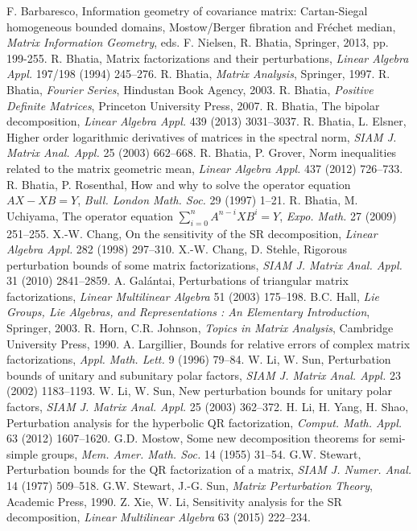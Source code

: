 \documentclass[12pt,epsfig,reqno]{amsart}
\theoremstyle{remark}
\begin{document}
\begin{thebibliography}{99}
 F. Barbaresco, Information geometry of covariance matrix: Cartan-Siegal homogeneous bounded domains, Mostow/Berger fibration and Fr\'echet median, {\it Matrix Information Geometry}, eds. F. Nielsen, R. Bhatia, Springer, 2013, pp. 199-255.
 R. Bhatia, Matrix factorizations and their perturbations, {\it Linear Algebra Appl.} 197/198 (1994) 245–276.
 R. Bhatia, {\it Matrix Analysis}, Springer, 1997.
 R. Bhatia, {\it Fourier Series}, Hindustan Book Agency, 2003.
 R. Bhatia, {\it Positive Definite Matrices}, Princeton University Press, 2007.
 R. Bhatia, The bipolar decomposition, {\it Linear Algebra Appl.} 439 (2013) 3031--3037.
 R. Bhatia, L. Elsner, Higher order logarithmic derivatives of matrices in the spectral norm, {\it SIAM J. Matrix Anal. Appl.} 25 (2003) 662--668.
 R. Bhatia, P. Grover, Norm inequalities related to the matrix geometric mean, {\it Linear Algebra Appl.} 437 (2012) 726--733.
 R. Bhatia, P. Rosenthal, How and why to solve the operator equation $AX-XB=Y$, {\it Bull. London Math. Soc.} 29 (1997) 1--21.
 R. Bhatia, M. Uchiyama, The operator equation $\sum_{i=0}^n A^{n-i} X B^i=Y$, {\it Expo. Math.} 27 (2009) 251--255.
 X.-W. Chang, On the sensitivity of the SR decomposition, {\it Linear Algebra Appl.} 282 (1998) 297--310.
 X.-W. Chang, D. Stehle, Rigorous perturbation bounds of some matrix factorizations, {\it SIAM J. Matrix Anal. Appl.} 31 (2010) 2841--2859.
 A. Gal\'antai, Perturbations of triangular matrix factorizations, {\it Linear Multilinear Algebra} 51 (2003) 175--198.
 B.C. Hall, {\it Lie Groups, Lie Algebras, and Representations : An Elementary Introduction},  Springer, 2003.
 R. Horn, C.R. Johnson, {\it Topics in Matrix Analysis}, Cambridge University Press, 1990.
 A. Largillier, Bounds for relative errors of complex matrix factorizations, {\it Appl. Math. Lett.} 9 (1996) 79--84.
 W. Li, W. Sun, Perturbation bounds of unitary and subunitary polar factors, {\it SIAM J. Matrix Anal. Appl.} 23 (2002) 1183--1193.
 W. Li, W. Sun, New perturbation bounds for unitary polar factors, {\it SIAM J. Matrix Anal. Appl.} 25 (2003) 362--372.
 H. Li, H. Yang, H. Shao, Perturbation analysis for the hyperbolic QR factorization, {\it Comput. Math. Appl.} 63 (2012) 1607--1620.
 G.D. Mostow, Some new decomposition theorems for semi-simple groups, {\it Mem. Amer. Math. Soc.} 14 (1955) 31--54.
 G.W. Stewart, Perturbation bounds for the QR factorization of a matrix, {\it SIAM J. Numer. Anal.} 14 (1977) 509--518.
 G.W. Stewart, J.-G. Sun, {\it Matrix Perturbation Theory}, Academic Press, 1990.
 Z. Xie, W. Li, Sensitivity analysis for the SR decomposition, {\it Linear Multilinear Algebra} 63 (2015) 222--234.
\end{thebibliography}
\end{document}
